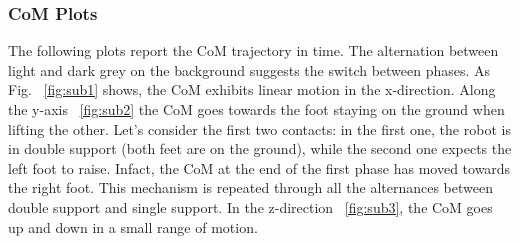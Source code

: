 \documentclass[main.tex]{subfiles}
\begin{document}
\subsubsection{CoM Plots}
The following plots report the CoM trajectory in time. 
The alternation between light and dark grey on the background suggests the switch between phases.
As Fig. ~\ref{fig:sub1} shows, the CoM exhibits linear motion in the x-direction.
Along the y-axis ~\ref{fig:sub2} the CoM goes towards the foot staying on the ground when lifting the other. Let's consider the first two contacts: in the first one, the robot is in double support (both feet are on the ground), while the second one expects the left foot to raise. Infact, the CoM at the end of the first phase has moved towards the right foot. This mechanism is repeated through all the alternances between double support and single support.
In the z-direction ~\ref{fig:sub3}, the CoM goes up and down in a small range of motion.
\end{document}
